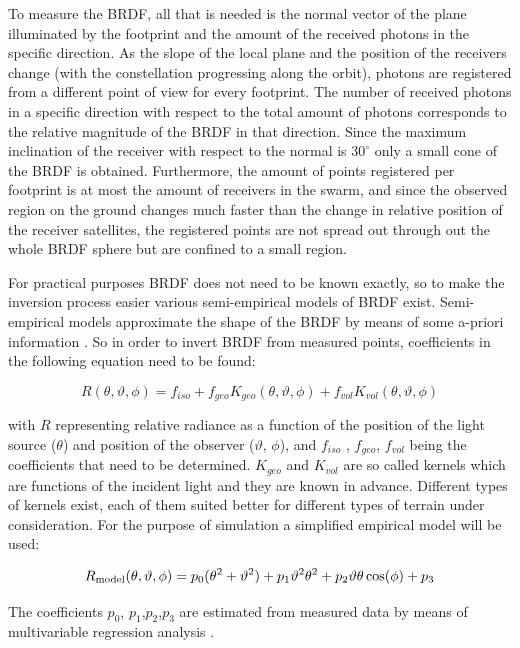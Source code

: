 To measure the \ac{BRDF}, all that is needed is the normal vector of the plane illuminated by the footprint and the amount of the received photons in the specific direction. As the slope of the local plane and the position of the receivers change (with the constellation progressing along the orbit), photons are registered from a different point of view for every footprint. The number of received photons in a specific direction with respect to the total amount of photons corresponds to the relative magnitude of the \ac{BRDF} in that direction. Since the maximum inclination of the receiver with respect to the normal is $30^\circ$ only a small cone of the \ac{BRDF} is obtained. Furthermore, the amount of points registered per footprint is at most the amount of receivers in the swarm, and since the observed region on the ground changes much faster than the change in relative position of the receiver satellites, the registered points are not spread out through out the whole \ac{BRDF} sphere but are confined to a small region. 

For practical purposes \ac{BRDF} does not need to be known exactly, so to make the inversion process easier various semi-empirical models of \ac{BRDF} exist. Semi-empirical models approximate the shape of the \ac{BRDF} by means of some a-priori information \cite{BRDFwanner}. So in order to invert \ac{BRDF} from measured points, coefficients in the following equation need to be found:

\[
R(\theta ,\vartheta ,\phi ) = f_{iso}  + f_{geo} K_{geo} (\theta ,\vartheta ,\phi ) + f_{vol} K_{vol} (\theta ,\vartheta ,\phi )
\]


with $R$ representing relative radiance as a function of the position of the light source ($\theta$) and position of the observer ($\vartheta$, $\phi$), and $f_{iso}$  , $f_{geo}$, $f_{vol}$  being the coefficients that need to be determined. $K_{geo}$ and $K_{vol}$ are so called kernels which are functions of the incident light and they are known in advance. Different types of kernels exist, each of them suited better for different types of terrain under consideration. 
For the purpose of simulation a simplified empirical model will be used:

\[
R_{{\rm{model}}} (\theta ,\vartheta ,\phi ){\rm{ }} = {\rm{ }}p_0 (\theta _{}^2  + \vartheta _{}^2 ) + p_1 \vartheta _{}^2 \theta _{}^2  + p_2 \vartheta \theta \cos (\phi ) + p_3 
\]

The coefficients $p_0$, $p_1$,$p_2$,$p_3$ are estimated from measured data by means of multivariable regression analysis \cite{BRDFrob}. 

